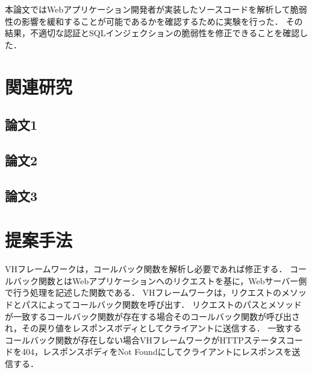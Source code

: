 \documentclass[a4paper,12pt]{jreport}
\begin{document}
本論文ではWebアプリケーション開発者が実装したソースコードを解析して脆弱性の影響を緩和することが可能であるかを確認するために実験を行った．
その結果，不適切な認証とSQLインジェクションの脆弱性を修正できることを確認した．

\chapter{関連研究}
\section{論文1}
\section{論文2}
\section{論文3}

\chapter{提案手法}
VHフレームワークは，コールバック関数を解析し必要であれば修正する．
コールバック関数とはWebアプリケーションへのリクエストを基に，Webサーバー側で行う処理を記述した関数である．
VHフレームワークは，リクエストのメソッドとパスによってコールバック関数を呼び出す．
リクエストのパスとメソッドが一致するコールバック関数が存在する場合そのコールバック関数が呼び出され，その戻り値をレスポンスボディとしてクライアントに送信する．
一致するコールバック関数が存在しない場合VHフレームワークがHTTPステータスコードを404，レスポンスボディをNot Foundにしてクライアントにレスポンスを送信する．
\end{document}
